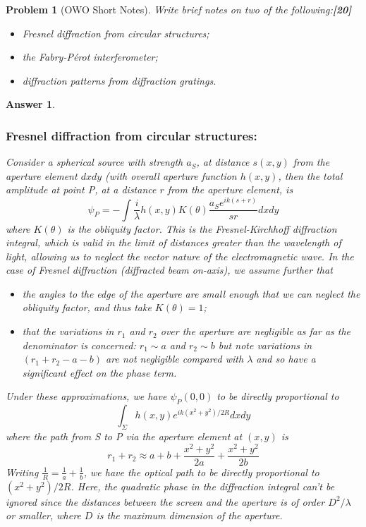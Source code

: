 \documentclass[a4paper]{article}
\newtheorem{ans}{Answer}[subsection]
\theoremstyle{new}
\newtheorem{qns}{Problem}[subsection]
\begin{document}
\newpage
\begin{qns}[OWO Short Notes]
Write brief notes on two of the following:\hfill\textbf{[20]}
\begin{itemize}
    \item Fresnel diffraction from circular structures;
    \item the Fabry-Pérot interferometer;
    \item diffraction patterns from diffraction gratings.
\end{itemize}
\end{qns}
\begin{ans}\leavevmode
\subsubsection*{Fresnel diffraction from circular structures:}
Consider a spherical source with strength $a_S$, at distance $s(x,y)$ from the aperture element $dxdy$ (with overall aperture function $h(x,y)$, then the total amplitude at point P, at a distance $r$ from the aperture element, is
$$\psi_P=-\int\frac{i}{\lambda}h(x,y)K(\theta)\frac{a_Se^{ik(s+r)}}{sr}dxdy$$
where $K(\theta)$ is the obliquity factor. This is the Fresnel-Kirchhoff diffraction integral, which is valid in the limit of distances greater than the wavelength of light, allowing us to neglect the vector nature of the electromagnetic wave. In the case of Fresnel diffraction (diffracted beam on-axis), we assume further that
\begin{itemize}
    \item the angles to the edge of the aperture are small enough that we can neglect the obliquity factor, and thus take $K(\theta)=1$;
    \item that the variations in $r_1$ and $r_2$ over the aperture are negligible as far as the denominator is concerned: $r_1\sim a$ and $r_2\sim b$ but note variations in $(r_1+r_2-a-b)$ are not negligible compared with $\lambda$ and so have a significant effect on the phase term.
\end{itemize}
Under these approximations, we have $\psi_P(0,0)$ to be directly proportional to
$$\int_\Sigma h(x,y)e^{ik(x^2+y^2)/2R}dxdy$$
where the path from S to P via the aperture element at $(x,y)$ is
$$r_1+r_2\approx a+b+\frac{x^2+y^2}{2a}+\frac{x^2+y^2}{2b}$$
Writing $\frac{1}{R}=\frac{1}{a}+\frac{1}{b}$, we have the optical path to be directly proportional to $(x^2+y^2)/2R$. Here, the quadratic phase in the diffraction integral can't be ignored since the distances between the screen and the aperture is of order $D^2/\lambda$ or smaller, where $D$ is the maximum dimension of the aperture.\\[5pt]

\end{ans}
\end{document}
